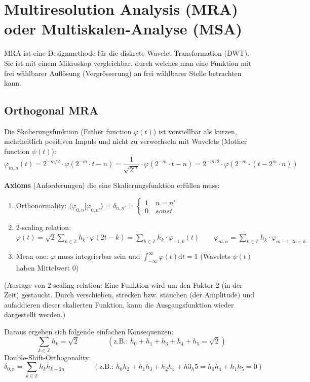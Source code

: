 \section{Multiresolution Analysis (MRA) oder Multiskalen-Analyse (MSA)}
MRA ist eine Designmethode für die diskrete Wavelet Transformation (DWT). Sie ist mit einem Mikroskop vergleichbar, durch welches man eine Funktion mit frei wählbarer Auflösung (Vergrösserung) an frei wählbarer Stelle betrachten kann.

\subsection{Orthogonal MRA}
Die Skalierungsfunktion (Father function $\varphi(t)$) ist vorstellbar als kurzen, mehrheitlich positiven Impuls und nicht zu verwechseln mit Wavelets (Mother function $\psi(t)$): 
\[
	\varphi_{m,n}(t)=2^{-m/2} \cdot \varphi(2^{-m}\cdot t - n) = \frac{1}{\sqrt{2^{m}}} \cdot \varphi(2^{-m}\cdot t -n) = 2^{-m/2} \cdot \varphi(2^{-m}\cdot (t - 2^{m}\cdot n))
\]

\textbf{Axioms} (Anforderungen) die eine Skalierungsfunktion erfüllen muss:
\begin{enumerate}
	\item Orthonormality: $ \langle \varphi_{0,n}|\varphi_{0,n'} \rangle = \delta_{n,n'} =  \begin{cases} 1 \quad n=n'\\ 0 \quad sonst  \end{cases}  $
	\item 2-scaling relation: $ \varphi(t) = \sqrt{2} \sum_{k \in \mathbb{Z}} h_k \cdot \varphi(2t-k) = \sum_{k \in \mathbb{Z}} h_k \cdot \varphi_{-1,k}(t) \qquad \varphi_{m,n}=\sum_{k \in \mathbb{Z}} h_k \cdot \varphi_{m-1,2n+k} $
	\item Mean one: $ \varphi \text{ muss integrierbar sein und } \int_{-\infty}^{\infty}\varphi(t) \mathrm{d}t = 1 $ (Wavelets $\psi(t)$ haben Mittelwert 0)
\end{enumerate}

(Aussage von 2-scaling relation: Eine Funktion wird um den Faktor 2 (in der Zeit) gestaucht. Durch verschieben, strecken bzw. stauchen (der Amplitude) und aufaddieren dieser skalierten Funktion, kann die  Ausgangsfunktion wieder dargestellt werden.)

Daraus ergeben sich folgende einfachen Konsequenzen:
\[ 
	\sum_{k \in \mathbb{Z}} h_k = \sqrt{2} \qquad \qquad (\text{z.B.: } h_0 + h_1 + h_3 + h_4 + h_5 = \sqrt{2})
\]
Double-Shift-Orthogonality:
\[
	\delta_{0,n} = \sum_{k \in \mathbb{Z}} h_k h_{k-2n} 
	\qquad \qquad 
	(\text{z.B.: } h_0h_2 + h_1h_3 + h_2h_4 + h3_h5 = h_0h_4+h_1h_5 = 0 )
\]

